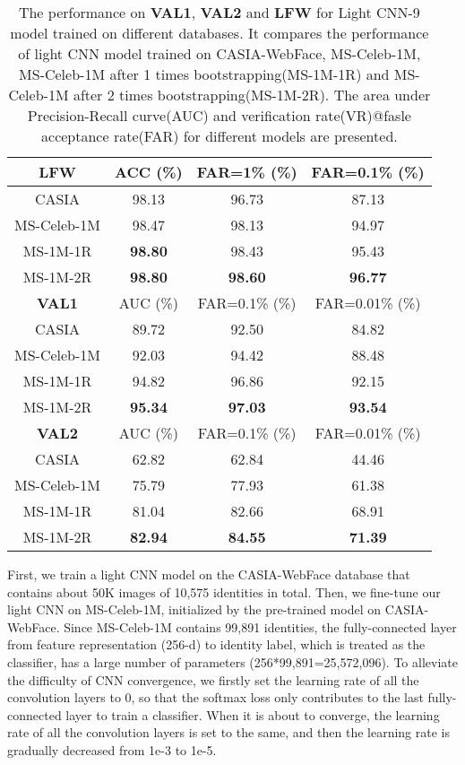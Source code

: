 \documentclass[journal,transmag]{IEEEtran}
\begin{document}
\begin{table}[t]
\centering
\caption{The performance on \textbf{VAL1}, \textbf{VAL2} and \textbf{LFW} for Light CNN-9 model trained on different databases. It compares the performance of light CNN model trained on CASIA-WebFace, MS-Celeb-1M, MS-Celeb-1M after 1 times bootstrapping(MS-1M-1R) and MS-Celeb-1M after 2 times bootstrapping(MS-1M-2R). The area under Precision-Recall curve(AUC) and verification rate(VR)@fasle acceptance rate(FAR) for different models are presented. }
\begin{tabular}{|c|c|c|c|}
\hline
\textbf{LFW} &ACC (\%) & FAR=1\% (\%) & FAR=0.1\% (\%) \\
\hline
CASIA & 98.13  & 96.73 & 87.13 \\
\hline
MS-Celeb-1M & 98.47  & 98.13 & 94.97  \\
\hline
MS-1M-1R & \textbf{98.80} & 98.43 & 95.43 \\
\hline
MS-1M-2R & \textbf{98.80}  & \textbf{98.60} & \textbf{96.77} \\
\hline
\hline
\textbf{VAL1} &AUC (\%) & FAR=0.1\% (\%) & FAR=0.01\% (\%) \\
\hline
CASIA & 89.72  & 92.50 & 84.82  \\
\hline
MS-Celeb-1M & 92.03  & 94.42 & 88.48  \\
\hline
MS-1M-1R & 94.82  & 96.86 & 92.15  \\
\hline
MS-1M-2R & \textbf{95.34} & \textbf{97.03} & \textbf{93.54}  \\
\hline
\hline
\textbf{VAL2} &AUC (\%) & FAR=0.1\% (\%)& FAR=0.01\% (\%)\\
\hline
CASIA & 62.82  & 62.84 & 44.46 \\
\hline
MS-Celeb-1M & 75.79  & 77.93 & 61.38  \\
\hline
MS-1M-1R & 81.04 & 82.66 & 68.91 \\
\hline
MS-1M-2R & \textbf{82.94}  & \textbf{84.55} & \textbf{71.39} \\
\hline
\end{tabular}
\label{bootstrapping_result}
\end{table}

First, we train a light CNN model on the CASIA-WebFace database that contains about 50K images of 10,575 identities in total. Then, we fine-tune our light CNN on MS-Celeb-1M, initialized by the pre-trained model on CASIA-WebFace. Since MS-Celeb-1M contains 99,891 identities, the fully-connected layer from feature representation (256-d) to identity label, which is treated as the classifier, has a large number of parameters (256*99,891=25,572,096). To alleviate the difficulty of CNN convergence, we firstly set the learning rate of all the convolution layers to 0, so that the softmax loss only contributes to the last fully-connected layer to train a classifier. When it is about to converge, the learning rate of all the convolution layers is set to the same, and then the learning rate is gradually decreased from 1e-3 to 1e-5.
\end{document}
